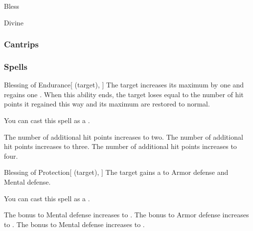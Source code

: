 \newpage
\begin{spellsection}{Bless}

\begin{spellheader}
\end{spellheader}


 Divine

\subsubsection{Cantrips}


\end{spellsection}


\subsubsection{Spells}


\lowercase{\hypertarget{spell:Blessing of Endurance}{}}\label{spell:Blessing of Endurance}
\begin{attuneability}[Rank 1]{\hypertarget{spell:Blessing of Endurance}{Blessing of Endurance}}[ (target), ]
The target increases its maximum  by one and regains one .
When this ability ends, the target loses  equal to the number of hit points it regained this way and its maximum  are restored to normal.

You can cast this spell as a .

\rankline
{} The number of additional hit points increases to two.
 The number of additional hit points increases to three.
 The number of additional hit points increases to four.
\end{attuneability}
\vspace{0.25em}



\lowercase{\hypertarget{spell:Blessing of Protection}{}}\label{spell:Blessing of Protection}
\begin{attuneability}[Rank 1]{\hypertarget{spell:Blessing of Protection}{Blessing of Protection}}[ (target), ]
The target gains a   to Armor defense and Mental defense.

You can cast this spell as a .

\rankline
{} The bonus to Mental defense increases to .
 The bonus to Armor defense increases to .
 The bonus to Mental defense increases to .
\end{attuneability}
\vspace{0.25em}



